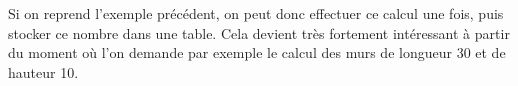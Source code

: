 \ifprof
\begin{corrige}
Si on reprend l'exemple précédent, on peut donc effectuer
ce calcul une fois, puis stocker ce nombre dans une table. Cela devient très fortement intéressant à partir du moment où l'on demande par exemple le calcul des murs de longueur 30 et de hauteur 10.
\end{corrige}
\else
\fi
%
